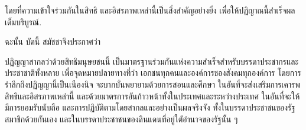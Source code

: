 โดย{\wbr}ที่{\wbr}ความ{\wbr}เข้า\-ใจ{\wbr}ร่วม{\wbr}กัน{\wbr}ใน{\wbr}สิทธิ และ{\wbr}อิสร\-ภาพ{\wbr}เหล่า{\wbr}นี้{\wbr}เป็น{\wbr}สิ่ง{\wbr}สำ\-คัญ{\wbr}อย่าง{\wbr}ยิ่ง เพื่อ{\wbr}ให้{\wbr}ปฏิ\-ญาณ{\wbr}นี้{\wbr}สำ\-เร็จ{\wbr}ผล{\wbr}เต็ม{\wbr}บริ\-บูรณ์.

ฉะ\-นั้น บัด\-นี้ สมัช\-ชา{\wbr}จึง{\wbr}ประ\-กาศ{\wbr}ว่า

ปฏิญ\-ญา{\wbr}สา\-กล{\wbr}ว่า\-ด้วย{\wbr}สิทธิ{\wbr}มนุษย{\wbr}ชน{\wbr}นี้ เป็น{\wbr}มาตร\-ฐาน{\wbr}ร่วม{\wbr}กัน{\wbr}แห่ง{\wbr}ความ{\wbr}สำ\-เร็จ{\wbr}สำ\-หรับ{\wbr}บรร\-ดา{\wbr}ประ\-ชา\-กร{\wbr}และ{\wbr}ประ\-ชา\-ชาติ{\wbr}ทั้ง\-หลาย เพื่อ{\wbr}จุด{\wbr}หมาย{\wbr}ปลาย\-ทาง{\wbr}ที่{\wbr}ว่า เอก\-ชน{\wbr}ทุก{\wbr}คน{\wbr}และ{\wbr}องค์\-การ{\wbr}ชอง{\wbr}สัง\-คม{\wbr}ทุก{\wbr}องค์\-การ โดย{\wbr}การ{\wbr}รำ\-ลึก{\wbr}ถึง{\wbr}ปฏิญ\-ญา{\wbr}นี้{\wbr}เป็น{\wbr}เนือง{\wbr}นิจ จะ{\wbr}บาก\-บั่น{\wbr}พยา\-ยาม{\wbr}ด้วย{\wbr}การ{\wbr}สอน{\wbr}และ{\wbr}ศึก\-ษา ใน{\wbr}อัน{\wbr}ที่{\wbr}จะ{\wbr}ส่ง\-เสริม{\wbr}การ{\wbr}เคา\-รพ{\wbr}สิทธิ{\wbr}และ{\wbr}อิสร\-ภาพ{\wbr}เหล่า{\wbr}นี้ และ{\wbr}ด้วย{\wbr}มาตร\-การ{\wbr}อัน{\wbr}ก้าว\-หน้า{\wbr}ทั้ง{\wbr}ใน{\wbr}ประ\-เทศ{\wbr}และ{\wbr}ระ\-หว่าง{\wbr}ประ\-เทศ ใน{\wbr}อัน{\wbr}ที่{\wbr}จะ{\wbr}ให้{\wbr}มี{\wbr}การ{\wbr}ยอม\-รับ{\wbr}นับ\-ถือ และ{\wbr}การ{\wbr}ปฏิ\-บัติ{\wbr}ตาม{\wbr}โดย{\wbr}สา\-กล{\wbr}และ{\wbr}อย่าง{\wbr}เป็น{\wbr}ผล{\wbr}จริง\-จัง ทั้ง{\wbr}ใน{\wbr}บรร\-ดา{\wbr}ประ\-ชา\-ชน{\wbr}ของ{\wbr}รัฐ{\wbr}สมา\-ชิก{\wbr}ด้วย{\wbr}กัน\-เอง และ{\wbr}ใน{\wbr}บรร\-ดา{\wbr}ประ\-ชา\-ชน{\wbr}ของ{\wbr}ดิน\-แดน{\wbr}ที่{\wbr}อยู่{\wbr}ใตั{\wbr}อำ\-นาจ{\wbr}ของ{\wbr}รัฐ{\wbr}นั้น ๆ
